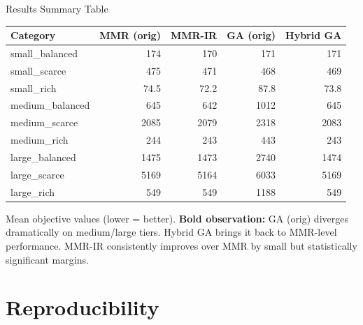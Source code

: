 \documentclass[aspectratio=43,8pt]{beamer}
\begin{document}
\begin{frame}{Results Summary Table}
\begin{table}[h]
\centering
\small
\begin{tabular}{lrrrr}
\toprule
\textbf{Category} & \textbf{MMR (orig)} & \textbf{MMR-IR} & \textbf{GA (orig)} & \textbf{Hybrid GA} \\
\midrule
small\_balanced & 174 & 170 & 171 & 171 \\
small\_scarce & 475 & 471 & 468 & 469 \\
small\_rich & 74.5 & 72.2 & 87.8 & 73.8 \\
\midrule
medium\_balanced & 645 & 642 & 1012 & 645 \\
medium\_scarce & 2085 & 2079 & 2318 & 2083 \\
medium\_rich & 244 & 243 & 443 & 243 \\
\midrule
large\_balanced & 1475 & 1473 & 2740 & 1474 \\
large\_scarce & 5169 & 5164 & 6033 & 5169 \\
large\_rich & 549 & 549 & 1188 & 549 \\
\bottomrule
\end{tabular}
\end{table}

\vspace{0.2cm}
{\footnotesize Mean objective values (lower = better). \textbf{Bold observation:} GA (orig) diverges dramatically on medium/large tiers. Hybrid GA brings it back to MMR-level performance. MMR-IR consistently improves over MMR by small but statistically significant margins.}
\end{frame}

\section{Reproducibility}
\end{document}
